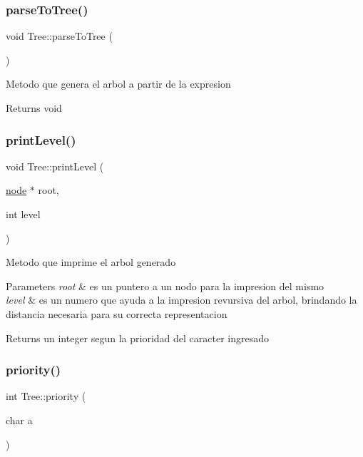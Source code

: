 \subsubsection{\texorpdfstring{parse\+To\+Tree()}{parseToTree()}}
{\footnotesize\ttfamily void Tree\+::parse\+To\+Tree (\begin{DoxyParamCaption}{ }\end{DoxyParamCaption})}

Metodo que genera el arbol a partir de la expresion \begin{DoxyReturn}{Returns}
void 
\end{DoxyReturn}
\hypertarget{class_tree_a105cab53eb81166b616ed80135de2791}{}\label{class_tree_a105cab53eb81166b616ed80135de2791} 
\subsubsection{\texorpdfstring{print\+Level()}{printLevel()}}
{\footnotesize\ttfamily void Tree\+::print\+Level (\begin{DoxyParamCaption}\item[{\hyperlink{structnode}{node} $\ast$}]{root,  }\item[{int}]{level }\end{DoxyParamCaption})}

Metodo que imprime el arbol generado 
\begin{DoxyParams}{Parameters}
{\em root} & es un puntero a un nodo para la impresion del mismo \\
\hline
{\em level} & es un numero que ayuda a la impresion revursiva del arbol, brindando la distancia necesaria para su correcta representacion \\
\hline
\end{DoxyParams}
\begin{DoxyReturn}{Returns}
un integer segun la prioridad del caracter ingresado 
\end{DoxyReturn}
\hypertarget{class_tree_a174fbb13ce6ff6cc899c226ae4d04b02}{}\label{class_tree_a174fbb13ce6ff6cc899c226ae4d04b02} 
\subsubsection{\texorpdfstring{priority()}{priority()}}
{\footnotesize\ttfamily int Tree\+::priority (\begin{DoxyParamCaption}\item[{char}]{a }\end{DoxyParamCaption})}


